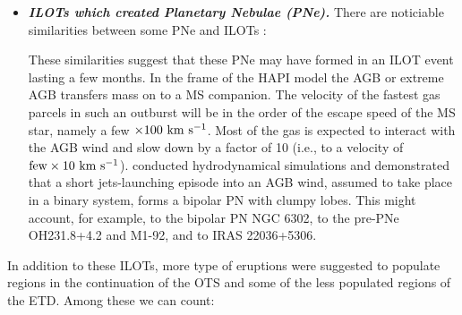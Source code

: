 \documentclass[modern]{aastex62}
\newcommand{\emphbf}[1]{\textbf{\emph{#1}}}
\def \kms{~\rm{km~s^{-1}}}
\begin{document}
\begin{itemize}
\item \emphbf{ILOTs which created Planetary Nebulae (PNe).} There are noticiable similarities between some PNe and ILOTs \citep{2012ApJ...746..100S}: 
These similarities suggest that these PNe may have formed in an ILOT event lasting a few months. In the frame of the HAPI model the AGB or extreme AGB transfers mass on to a MS companion.
The velocity of the fastest gas parcels in such an outburst will be in the order of the escape speed of the MS star, namely a few $\times100 \kms$. 
Most of the gas is expected to interact with the AGB wind and slow down by a factor of 10 (i.e., to a velocity of ${\rm few} \times 10 \kms$).
\cite{2013MNRAS.436.1961A} conducted hydrodynamical simulations and demonstrated that a short jets-launching episode into an AGB wind, assumed to take place in a binary system, forms a bipolar PN with clumpy lobes. 
This might account, for example, to the bipolar PN NGC 6302, to the pre-PNe OH231.8+4.2 and M1-92, and to IRAS 22036+5306.

\end{itemize}

In addition to these ILOTs, more type of eruptions were suggested to populate regions in the continuation of the OTS and some of the less populated regions of the ETD. Among these we can count:
\end{document}
